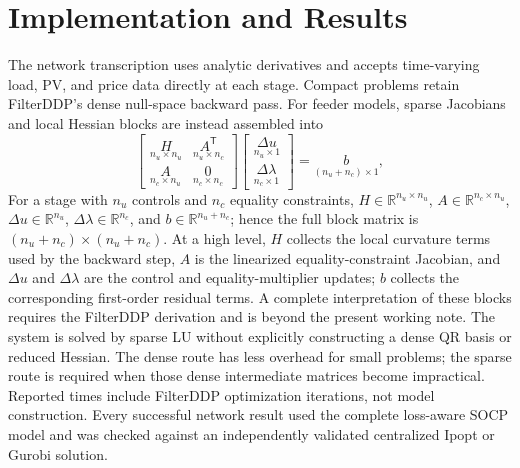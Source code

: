 \section{Implementation and Results}

The network transcription uses analytic derivatives and accepts time-varying
load, PV, and price data directly at each stage. Compact problems retain
FilterDDP's dense null-space backward pass. For feeder models, sparse
Jacobians and local Hessian blocks are instead assembled into
\begin{equation}
\begin{bmatrix}
\underset{n_u\times n_u}{H} &
\underset{n_u\times n_c}{A^{\mathsf T}}\\
\underset{n_c\times n_u}{A} &
\underset{n_c\times n_c}{0}
\end{bmatrix}
\begin{bmatrix}
\underset{n_u\times1}{\Delta u}\\
\underset{n_c\times1}{\Delta\lambda}
\end{bmatrix}
=\underset{(n_u+n_c)\times1}{b},
\label{eq:sparse_kkt}
\end{equation}
For a stage with $n_u$ controls and $n_c$ equality constraints,
$H\in\mathbb R^{n_u\times n_u}$, $A\in\mathbb R^{n_c\times n_u}$,
$\Delta u\in\mathbb R^{n_u}$, $\Delta\lambda\in\mathbb R^{n_c}$, and
$b\in\mathbb R^{n_u+n_c}$; hence the full block matrix is
$(n_u+n_c)\times(n_u+n_c)$.
At a high level, $H$ collects the local curvature terms used by the backward
step, $A$ is the linearized equality-constraint Jacobian, and $\Delta u$ and
$\Delta\lambda$ are the control and equality-multiplier updates; $b$ collects
the corresponding first-order residual terms. A complete interpretation of
these blocks requires the FilterDDP derivation and is beyond the present
working note. The system is solved by sparse LU without explicitly constructing a dense QR basis or
reduced Hessian. The dense route has less overhead for small problems; the
sparse route is required when those dense intermediate matrices become
impractical. Reported times include FilterDDP optimization iterations, not
model construction. Every successful network result used the complete
loss-aware SOCP model and was checked against an independently validated
centralized Ipopt or Gurobi solution.

\newcommand{\resultyes}{\textcolor{green!55!black}{\ensuremath{\checkmark}}}
\newcommand{\resultno}{\textcolor{red!75!black}{\ensuremath{\times}}}

